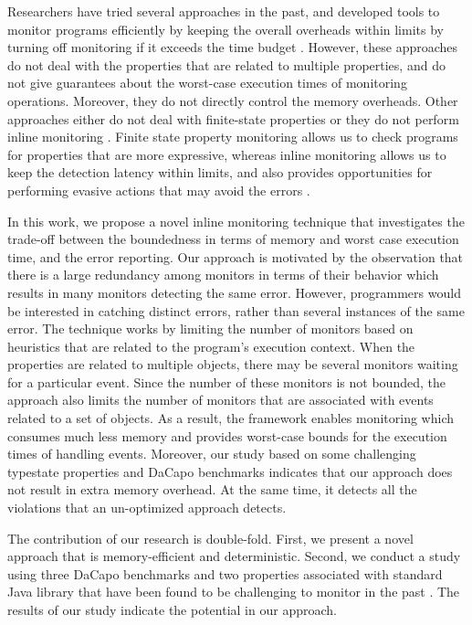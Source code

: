 Researchers have tried several approaches in the past, and developed tools to 
monitor programs efficiently by keeping the overall overheads within limits by 
turning off monitoring if it exceeds the time budget \cite{}. However, these 
approaches do not deal with the properties that are related to multiple 
properties, and do not give guarantees about the worst-case execution times of 
monitoring operations. Moreover, they do not directly control the memory 
overheads. Other approaches either do not deal with finite-state properties or 
they do not perform inline monitoring \cite{}. Finite state property monitoring 
allows us to check programs for properties that are more expressive, whereas 
inline monitoring allows us to keep the detection latency within limits, and 
also provides opportunities for performing evasive actions that may avoid the 
errors \cite{}.

In this work, we propose a novel inline monitoring technique that investigates 
the trade-off between the boundedness in terms of memory and worst case 
execution time, and  the error reporting. Our approach is motivated by the 
observation that there is a large redundancy among monitors in terms of their 
behavior which results in many monitors detecting the same error. However, 
programmers would be interested in catching distinct errors, rather than several 
instances of the same error. The technique works by limiting the number of 
monitors based on heuristics that are related to the program's execution 
context. When the properties are related to multiple objects, there may be 
several monitors waiting for a particular event. Since the number of these 
monitors is not bounded, the approach also limits the number of monitors that 
are associated with events related to a set of objects. As a result, the 
framework enables monitoring which consumes much less memory and provides 
worst-case bounds for the execution 
times of handling events. Moreover, our study based on some challenging 
typestate properties and DaCapo benchmarks indicates that our approach does not 
result in extra memory overhead. At the same time, it detects all the violations 
that an un-optimized approach detects.

The contribution of our research is double-fold. First, we present a novel 
approach that is memory-efficient and deterministic. Second, we conduct a study 
using three DaCapo benchmarks \cite{} and two properties associated with 
standard Java library that have been found to be challenging to monitor in the 
past \cite{}. The results of our study indicate the potential in our approach.


